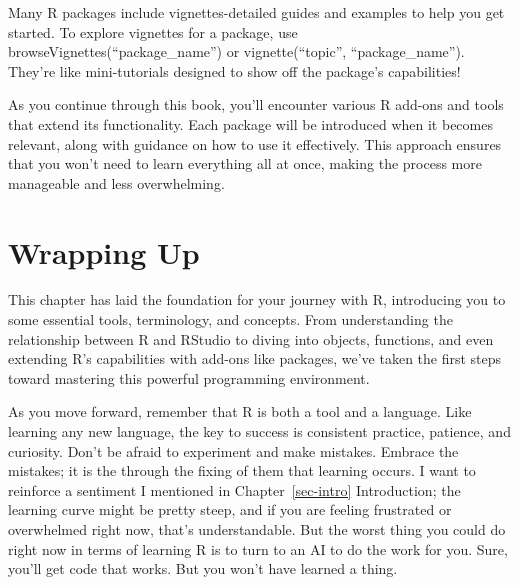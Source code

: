 \documentclass[
  letterpaper,
]{book}
\begin{document}
\begin{tcolorbox}[enhanced jigsaw, colframe=quarto-callout-tip-color-frame, breakable, arc=.35mm, bottomtitle=1mm, bottomrule=.15mm, colbacktitle=quarto-callout-tip-color!10!white, rightrule=.15mm, colback=white, opacityback=0, opacitybacktitle=0.6, coltitle=black, left=2mm, toptitle=1mm, toprule=.15mm, titlerule=0mm, leftrule=.75mm, title=\textcolor{quarto-callout-tip-color}{\faLightbulb}\hspace{0.5em}{Tip from the Helpdesk: Deep Dive into Packages with Vignettes}]

Many R packages include vignettes-detailed guides and examples to help
you get started. To explore vignettes for a package, use
browseVignettes(``package\_name'') or vignette(``topic'',
``package\_name''). They're like mini-tutorials designed to show off the
package's capabilities!

\end{tcolorbox}

As you continue through this book, you'll encounter various R add-ons
and tools that extend its functionality. Each package will be introduced
when it becomes relevant, along with guidance on how to use it
effectively. This approach ensures that you won't need to learn
everything all at once, making the process more manageable and less
overwhelming.

\section{Wrapping Up}\label{wrapping-up}

This chapter has laid the foundation for your journey with R,
introducing you to some essential tools, terminology, and concepts. From
understanding the relationship between R and RStudio to diving into
objects, functions, and even extending R's capabilities with add-ons
like packages, we've taken the first steps toward mastering this
powerful programming environment.

As you move forward, remember that R is both a tool and a language. Like
learning any new language, the key to success is consistent practice,
patience, and curiosity. Don't be afraid to experiment and make
mistakes. Embrace the mistakes; it is the through the fixing of them
that learning occurs. I want to reinforce a sentiment I mentioned in
Chapter~\ref{sec-intro} Introduction; the learning curve might be pretty
steep, and if you are feeling frustrated or overwhelmed right now,
that's understandable. But the worst thing you could do right now in
terms of learning R is to turn to an AI to do the work for you. Sure,
you'll get code that works. But you won't have learned a thing.
\end{document}
